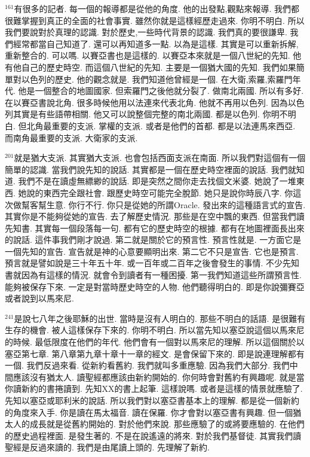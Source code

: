 \documentclass{book}
\begin{document}
$^{161}$有很多的記者.
每一個的報導都是從他的角度.
他的出發點,觀點來報導.
我們都很難掌握到真正的全面的社會事實.
雖然你就是這樣經歷走過來.
你明不明白.
所以我們要說對於真理的認識.
對於歷史,一些時代背景的認識.
我們真的要很謙卑.
我們經常都當自己知道了.
還可以再知道多一點.
以為是這樣.
其實是可以重新拆解,重新整合的.
可以嗎.
以賽亞書也是這樣的.
以賽亞本來就是一個八世紀的先知.
他有他自己的歷史時空.
而這個八世紀的先知.
主要是一個猶大國的先知.
我們如果簡單對以色列的歷史.
他的觀念就是.
我們知道他曾經是一個.
在大衛,索羅,索羅門年代.
他是一個整合的地圖國家.
但索羅門之後他就分裂了.
做南北兩國.
所以有多好.
在以賽亞書說北角.
很多時候他用以法連來代表北角.
他就不再用以色列.
因為以色列其實是有些語帶相關.
他又可以說整個完整的南北兩國.
都是以色列.
你明不明白.
但北角最重要的支派.
掌權的支派.
或者是他們的首都.
都是以法連馬來西亞.
而南角最重要的支派.
大衛家的支派.

$^{201}$就是猶大支派.
其實猶大支派.
也會包括西面支派在南面.
所以我們對這個有一個簡單的認識.
當我們說先知的說話.
其實都是一個在歷史時空裡面的說話.
我們就知道.
我們不是在讀虛無縹緲的說話.
即是突然之間你走去找個文米婆.
她說了一堆東西.
她說的東西完全跟社會.
跟歷史時空可能完全脫節.
她只是說你時辰八字.
你這次做幫客幫生意.
你行不行.
你只是從她的所謂Oracle.
發出來的這種語言式的宣告.
其實你是不能夠從她的宣告.
去了解歷史情況.
那些是在空中飄的東西.
但當我們讀先知書.
其實每一個段落每一句.
都有它的歷史時空的根據.
都有在地圖裡面長出來的說話.
這件事我們剛才說過.
第二就是關於它的預言性.
預言性就是.
一方面它是一個先知的宣告.
宣告就是神的心意要顯明出來.
第二它不只是宣告.
它也是預言.
預言就是譬如說是三十年五十年.
或一百年或二百年之後會發生的事情.
不少先知書就因為有這樣的情況.
就會令到讀者有一種困擾.
第一我們知道這些所謂預言性.
能夠被保存下來.
一定是對當時歷史時空的人物.
他們聽得明白的.
即是你說彌賽亞或者說到以馬來尼.

$^{241}$是說七八年之後耶穌的出世.
當時是沒有人明白的.
那些不明白的話語.
是很難有生存的機會.
被人這樣保存下來的.
你明不明白.
所以當先知以塞亞說這個以馬來尼的時候.
最低限度在他們的年代.
他們會有一個對以馬來尼的理解.
所以這個關於以塞亞第七章.
第八章第九章十章十一章的經文.
是會保留下來的.
即是說連理解都有一個.
我們反過來看.
從新約看舊約.
我們就叫多重應驗.
因為我們大部分.
我們中間應該沒有猶太人.
讀聖經都應該由新約開始的.
你何時會對舊約有興趣呢.
就是當你讀新約的書捲讀到.
先知XX的書上起筆.
這樣說嗎.
或者是這樣的情景就應驗了.
先知以塞亞或耶利米的說話.
所以我們對以塞亞書基本上的理解.
都是從一個新約的角度來入手.
你是讀在馬太福音.
讀在保羅.
你才會對以塞亞書有興趣.
但一個猶太人的成長就是從舊約開始的.
對於他們來說.
那些應驗了的或將要應驗的.
在他們的歷史過程裡面.
是發生著的.
不是在說遙遠的將來.
對於我們基督徒.
其實我們讀聖經是反過來讀的.
我們是由尾讀上頭的.
先理解了新約.
\end{document}
